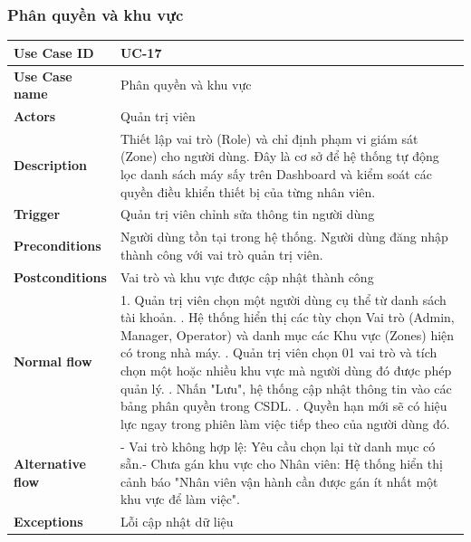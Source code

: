 \subsubsection{Phân quyền và khu vực}
\begin{tabular}{|p{3.5cm}|p{9.5cm}|}
\hline
\textbf{Use Case ID} & UC-17 \\
\hline
\textbf{Use Case name} & Phân quyền và khu vực \\
\hline
\textbf{Actors} & Quản trị viên \\
\hline
\textbf{Description} & 
Thiết lập vai trò (Role) và chỉ định phạm vi giám sát (Zone) cho người dùng. Đây là cơ sở để hệ thống tự động lọc danh sách máy sấy trên Dashboard và kiểm soát các quyền điều khiển thiết bị của từng nhân viên. \\
\hline
\textbf{Trigger} & Quản trị viên chỉnh sửa thông tin người dùng \\
\hline
\textbf{Preconditions} & Người dùng tồn tại trong hệ thống. Người dùng đăng nhập thành công với vai trò quản trị viên. \\
\hline
\textbf{Postconditions} & Vai trò và khu vực được cập nhật thành công \\
\hline
\textbf{Normal flow} & 
1. Quản trị viên chọn một người dùng cụ thể từ danh sách tài khoản. \newline
2. Hệ thống hiển thị các tùy chọn Vai trò (Admin, Manager, Operator) và danh mục các Khu vực (Zones) hiện có trong nhà máy. \newline
3. Quản trị viên chọn 01 vai trò và tích chọn một hoặc nhiều khu vực mà người dùng đó được phép quản lý. \newline
4. Nhấn "Lưu", hệ thống cập nhật thông tin vào các bảng phân quyền trong CSDL. \newline
5. Quyền hạn mới sẽ có hiệu lực ngay trong phiên làm việc tiếp theo của người dùng đó. \\
\hline
\textbf{Alternative flow} & 
 - Vai trò không hợp lệ: Yêu cầu chọn lại từ danh mục có sẵn.\newline - Chưa gán khu vực cho Nhân viên: Hệ thống hiển thị cảnh báo "Nhân viên vận hành cần được gán ít nhất một khu vực để làm việc". \\
\hline
\textbf{Exceptions} & Lỗi cập nhật dữ liệu \\
\hline
\end{tabular}


